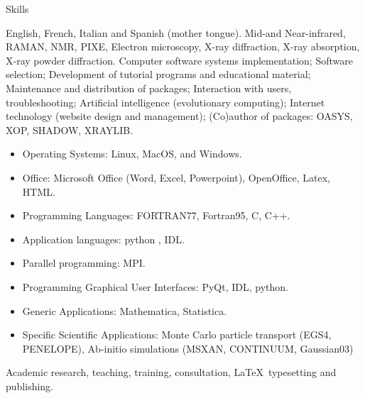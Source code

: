 \prefix{}
\begin{rubric}{Skills}


\entry*[Languages]
	English, French, Italian and Spanish (mother tongue).
	 Mid-and Near-infrared, RAMAN, NMR, PIXE, Electron microscopy, X-ray diffraction, X-ray absorption, X-ray powder diffraction.
Computer software systems implementation; Software selection; Development of tutorial programs and educational material; Maintenance and distribution of packages; Interaction with users, troubleshooting; Artificial intelligence (evolutionary computing); Internet technology (website design and management); (Co)author of packages: OASYS, XOP, SHADOW, XRAYLIB.

\begin{itemize}
\item Operating Systems: Linux, MacOS, and Windows.
\item Office: Microsoft Office (Word, Excel, Powerpoint), OpenOffice, Latex, HTML.  
\item Programming Languages: FORTRAN77, Fortran95, C, C++.
\item Application languages: python , IDL.
\item Parallel programming: MPI.
\item Programming Graphical User Interfaces: PyQt, IDL, python.
\item Generic Applications: Mathematica, Statistica.
\item Specific Scientific Applications: Monte Carlo particle transport (EGS4, PENELOPE), Ab-initio simulations (MSXAN, CONTINUUM, Gaussian03)
\end{itemize}
\entry*[Misc.]
	Academic research, teaching, training, consultation, \LaTeX\ typesetting and publishing.
\end{rubric}
